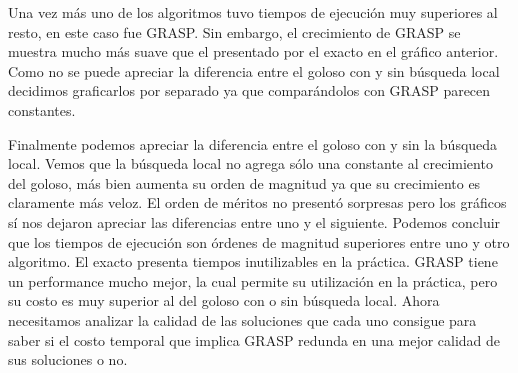 Una vez más uno de los algoritmos tuvo tiempos de ejecución muy superiores al resto, en este caso fue GRASP.
Sin embargo, el crecimiento de GRASP se muestra mucho más suave que el presentado por el exacto en el gráfico anterior.
Como no se puede apreciar la diferencia entre el goloso con y sin búsqueda local decidimos graficarlos por separado
ya que comparándolos con GRASP parecen constantes.
\begin{figure}[H]
    \begin{minipage}[t]{\linewidth}
		\centering
		\label{fig:ejercicio-6-comparacion-tiempos-menos-grasp}
    \end{minipage}
\end{figure}
Finalmente podemos apreciar la diferencia entre el goloso con y sin la búsqueda local. Vemos
que la búsqueda local no agrega sólo una constante al crecimiento del goloso, más bien aumenta 
su orden de magnitud ya que su crecimiento es claramente más veloz.
El orden de méritos no presentó sorpresas pero los gráficos sí nos dejaron apreciar las diferencias entre 
uno y el siguiente. Podemos concluir que los tiempos de ejecución son órdenes de magnitud superiores entre
uno y otro algoritmo. El exacto presenta tiempos inutilizables en la práctica. GRASP tiene un performance
mucho mejor, la cual permite su utilización en la práctica, pero su costo es muy superior al del goloso con o sin búsqueda local.
Ahora necesitamos analizar la calidad de las soluciones que cada uno consigue para saber si el costo
temporal que implica GRASP redunda en una mejor calidad de sus soluciones o no.

